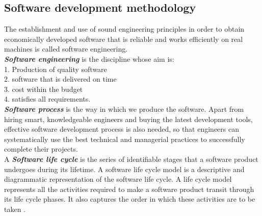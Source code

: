 \documentclass{scrartcl}
\begin{document}
  	\subsection{Software development methodology}
  	The establishment and use of sound engineering principles in order to obtain economically
developed software that is reliable and works efficiently on real machines is called software engineering.\\
\textbf{\textit{ Software engineering}} is the discipline whose aim is:\\
1. Production of quality software\\
2. software that is delivered on time\\
3. cost within the budget\\
4. satisfies all requirements.\\
\textbf{\textit{ Software process}} is the way in which we produce the software. Apart from hiring smart,
knowledgeable engineers and buying the latest development tools, effective software
development process is also needed, so that engineers can systematically use the best technical
and managerial practices to successfully complete their projects.\\
A \textbf{\textit{ Software life cycle}} is the series of identifiable stages that a software product undergoes during
its lifetime. A software life cycle model is a descriptive and diagrammatic representation of the
software life cycle. A life cycle model represents all the activities required to make a software
product transit through its life cycle phases. It also captures the order in which these activities are
to be taken .\\
\end{document}
